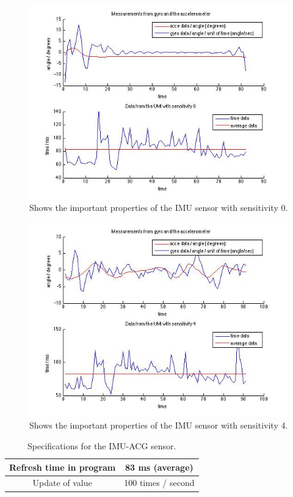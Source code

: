 \documentclass[a4paper]{article}
\begin{document}
        \begin{figure}[h]
		\centering
		\includegraphics[width=1.3\textwidth]{plot_data_UMI_sen_0_20150103}
		\caption{Shows the important properties of the IMU sensor with sensitivity 0.}
		\label{fig:plot_IMU_sensor_sensitivity_0}
	\end{figure}
	
	      \begin{figure}[h]
		\centering
		\includegraphics[width=1.3\textwidth]{plot_data_UMI_sen_4_20150107}
		\caption{Shows the important properties of the IMU sensor with sensitivity 4.}
		\label{fig:plot_IMU_sensor_sensitivity_4}
	\end{figure}
	
	
	\begin{table}[h]
		\center
		\begin{tabular}{|c |c|}
			\hline
			 Refresh time in program &  83 ms (average)   \\ 
			\hline
			Update of value &  100 times / second  \\ 
			\hline
		\end{tabular}
		\caption{Specifications for the IMU-ACG sensor.}
		\label{table:IMU_sensor}
	\end{table}
	
\end{document}
